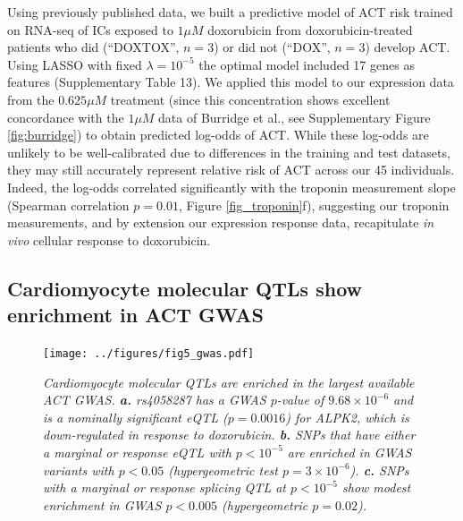 \documentclass{article}
\begin{document}
Using previously published data\cite{Burridge2016}, we built a predictive model of ACT risk trained on RNA-seq of ICs exposed to $1 \mu M$ doxorubicin from doxorubicin-treated patients who did (``DOXTOX'', $n=3$) or did not (``DOX'', $n=3$) develop ACT. Using LASSO with fixed $\lambda=10^{-5}$ the optimal model included 17 genes as features (Supplementary Table 13). We applied this model to our expression data from the $0.625 \mu M$ treatment (since this concentration shows excellent concordance with the $1 \mu M$ data of Burridge et al., see Supplementary Figure \ref{fig:burridge}) to obtain predicted log-odds of ACT. While these log-odds are unlikely to be well-calibrated due to differences in the training and test datasets, they may still accurately represent relative risk of ACT across our 45 individuals. Indeed, the log-odds correlated significantly with the troponin measurement slope (Spearman correlation $p=0.01$, Figure \ref{fig_troponin}f), suggesting our troponin measurements, and by extension our expression response data, recapitulate \emph{in vivo} cellular response to doxorubicin. 

\subsection*{Cardiomyocyte molecular QTLs show enrichment in ACT GWAS} 

\begin{figure}
\begin{center}
    \texttt{[image: ../figures/fig5\_gwas.pdf]}     \caption{\it{Cardiomyocyte molecular QTLs are enriched in the largest available ACT GWAS\cite{Schneider2016}. \textbf{a.} rs4058287 has a GWAS $p$-value of $9.68\times 10^{-6}$ and is a nominally significant eQTL ($p=0.0016$) for \emph{ALPK2}, which is down-regulated in response to doxorubicin. \textbf{b.} SNPs that have either a marginal or response eQTL with $p<10^{-5}$ are enriched in GWAS variants with $p<0.05$ (hypergeometric test $p=3 \times 10^{-6}$). \textbf{c.} SNPs with a marginal or response splicing QTL at $p<10^{-5}$ show modest enrichment in GWAS $p<0.005$ (hypergeometric $p=0.02$).}}
    \label{fig:gwas}
    \end{center}
\end{figure}

\end{document}
